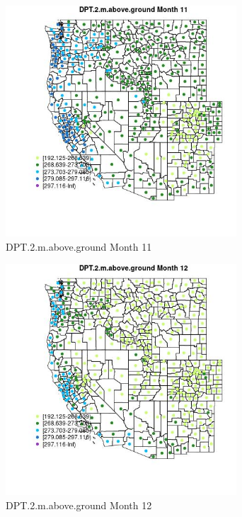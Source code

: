 \begin{figure} 
\centering  
\includegraphics[width=0.77\textwidth]{Code_Outputs/df_report_ML_predictors_CountyCentroid_Locations_Dates_2008-01-01to2018-12-31_MapObsMo11DPT2maboveground.jpg} 
\caption{\label{fig:df_report_ML_predictors_CountyCentroid_Locations_Dates_2008-01-01to2018-12-31MapObsMo11DPT2maboveground}DPT.2.m.above.ground Month 11} 
\end{figure} 
 

\clearpage 

\begin{figure} 
\centering  
\includegraphics[width=0.77\textwidth]{Code_Outputs/df_report_ML_predictors_CountyCentroid_Locations_Dates_2008-01-01to2018-12-31_MapObsMo12DPT2maboveground.jpg} 
\caption{\label{fig:df_report_ML_predictors_CountyCentroid_Locations_Dates_2008-01-01to2018-12-31MapObsMo12DPT2maboveground}DPT.2.m.above.ground Month 12} 
\end{figure} 
 


